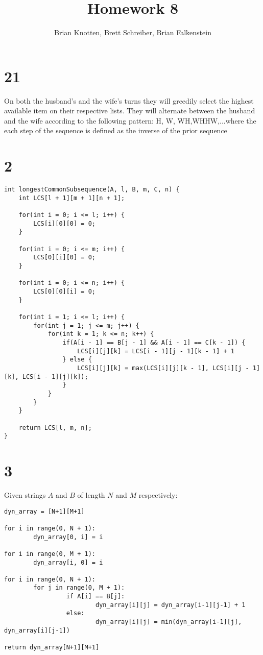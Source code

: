 \documentclass[letterpaper,notitlepage,twoside]{article}
\begin{document}
\title{Homework 8}
\author{Brian Knotten, Brett Schreiber, Brian Falkenstein}
\maketitle

\section*{21}
On both the husband's and the wife's turns they will greedily select the highest available item on their respective lists. They will alternate between the husband and the wife according to the following pattern: H, W, WH,WHHW,...where the each step of the sequence is defined as the inverse of the prior sequence 

\section*{2}
\begin{verbatim}
int longestCommonSubsequence(A, l, B, m, C, n) {
    int LCS[l + 1][m + 1][n + 1];

    for(int i = 0; i <= l; i++) {
        LCS[i][0][0] = 0;
    }

    for(int i = 0; i <= m; i++) {
        LCS[0][i][0] = 0;
    }

    for(int i = 0; i <= n; i++) {
        LCS[0][0][i] = 0;
    }

    for(int i = 1; i <= l; i++) {
        for(int j = 1; j <= m; j++) {
            for(int k = 1; k <= n; k++) {
                if(A[i - 1] == B[j - 1] && A[i - 1] == C[k - 1]) {
                    LCS[i][j][k] = LCS[i - 1][j - 1][k - 1] + 1
                } else {
                    LCS[i][j][k] = max(LCS[i][j][k - 1], LCS[i][j - 1][k], LCS[i - 1][j][k]);
                }
            }
        }
    }

    return LCS[l, m, n];
}
\end{verbatim}
\section*{3}
Given strings $A$ and $B$ of length $N$ and $M$ respectively:
\begin{verbatim}
dyn_array = [N+1][M+1]

for i in range(0, N + 1):	
        dyn_array[0, i] = i

for i in range(0, M + 1):	
        dyn_array[i, 0] = i

for i in range(0, N + 1):
        for j in range(0, M + 1):
                 if A[i] == B[j]:
                         dyn_array[i][j] = dyn_array[i-1][j-1] + 1
                 else:
                         dyn_array[i][j] = min(dyn_array[i-1][j], dyn_array[i][j-1])

return dyn_array[N+1][M+1]
\end{verbatim}
\end{document}
